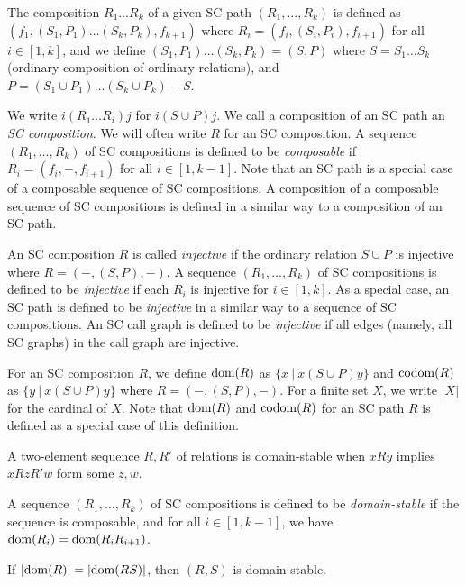 \begin{Def}\rm
The composition $R_1\ldots R_k$ of a given SC path $(R_1,\ldots,R_k)$ is
defined as
%
$(f_1,(S_1,P_1)\ldots(S_k,P_k),f_{k+1})$
%
where
%
$R_i=(f_i,(S_i,P_i),f_{i+1})$ for all $i \in [1,k]$,
%
and we define
%
$(S_1,P_1)\ldots(S_k,P_k) = (S,P)$
%
where
%
$S = S_1\ldots S_k$ (ordinary composition of ordinary relations), and
%
$P = (S_1 \cup P_1)\ldots (S_k \cup P_k) - S$.

We write $i(R_1\ldots R_i)j$ for $i (S \cup P) j$.
%
We call a composition of an SC path an {\em SC composition}.
%
We will often write $R$ for an SC composition.
%
A sequence $(R_1,\ldots,R_k)$ of SC compositions 
is defined to be {\em composable} if
$R_i = (f_i,-,f_{i+1})$ for all $i \in [1,k-1]$.
%
Note that an SC path is a special case of a composable sequence of 
SC compositions.
%
A composition of a composable sequence of SC compositions
is defined in a similar way to a composition of an SC path.

An SC composition $R$ is called {\em injective} if
the ordinary relation $S \cup P$ is injective
where
$R = (-,(S,P),-)$.
A sequence $(R_1,\ldots,R_k)$ of SC compositions is defined to be {\em injective} if
each $R_i$ is injective for $i \in [1,k]$.
As a special case,
an SC path is defined to be {\em injective} in a similar way to 
a sequence of SC compositions.
An SC call graph is defined to be {\em injective} if all edges 
(namely, all SC graphs) in the call graph are injective.

For an SC composition $R$, we define
%
${\rm dom}(R)$ as $\{x \ |\ x(S \cup P)y \}$ and
%
${\rm codom}(R)$ as $\{y \ |\ x(S \cup P)y \}$
where $R = (-,(S,P),-)$.
%
For a finite set $X$, we write $|X|$ for the cardinal of $X$.
%
Note that ${\rm dom}(R)$ and ${\rm codom}(R)$ for an SC path $R$ is 
defined as a special case of this definition.
\end{Def}

A two-element sequence $R,R'$ of relations is  
domain-stable when
$x R y$ implies $x R z R' w$ form some $z,w$.

\begin{Def}\rm
A sequence $(R_1,\ldots,R_k)$ of SC compositions
is defined to be {\em domain-stable}
if the sequence is composable, and
for all $i \in [1,k-1]$, 
we have ${\rm dom}(R_i) = {\rm dom}(R_iR_{i+1})$.
\end{Def}

\begin{Lemma}\label{lemma:cardinal}
If $|{\rm dom}(R)|=|{\rm dom}(RS)|$, then $(R,S)$ is domain-stable.
\end{Lemma}


